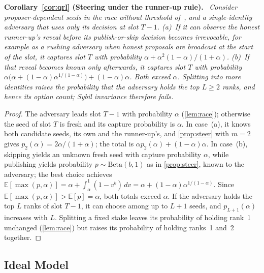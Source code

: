 \documentclass[10pt,journal,compsoc]{IEEEtran}
\theoremstyle{tplain}
\theoremstyle{tdef}
\theoremstyle{remark}
\newenvironment{restate}[1]{\par\smallskip\noindent\textbf{#1.}\ \itshape\ignorespaces}{\par\smallskip}
\begin{document}
\begin{restate}{Corollary~\ref{cor:qrl} (Steering under the runner-up rule)}
Consider proposer-dependent seeds in the race without threshold of~\cite{QRL}, and a single-identity adversary that uses only its decision at slot $T-1$. (a)~If it can observe the honest runner-up's reveal before its publish-or-skip decision becomes irrevocable, for example as a rushing adversary when honest proposals are broadcast at the start of the slot, it captures slot $T$ with probability $\alpha+\alpha^2(1-\alpha)/(1+\alpha)$. (b)~If that reveal becomes known only afterwards, it captures slot $T$ with probability $\alpha\big(\alpha+(1-\alpha)\alpha^{1/(1-\alpha)}\big)+(1-\alpha)\alpha$. Both exceed $\alpha$. Splitting into more identities raises the probability that the adversary holds the top $L\ge 2$ ranks, and hence its option count; Sybil invariance therefore fails.
\end{restate}
\begin{proof}
The adversary leads slot $T-1$ with probability $\alpha$ (\cref{lem:race}); otherwise the seed of slot $T$ is fresh and its capture probability is $\alpha$. In case~(a), it knows both candidate seeds, its own and the runner-up's, and \cref{prop:steer} with $m=2$ gives $p_2(\alpha)=2\alpha/(1+\alpha)$; the total is $\alpha p_2(\alpha)+(1-\alpha)\alpha$. In case~(b), skipping yields an unknown fresh seed with capture probability $\alpha$, while publishing yields probability $p\sim\mathrm{Beta}(b,1)$ as in \cref{prop:steer}, known to the adversary; the best choice achieves $\mathbb E[\max(p,\alpha)]=\alpha+\int_\alpha^1(1-v^b)\,dv=\alpha+(1-\alpha)\alpha^{1/(1-\alpha)}$. Since $\mathbb E[\max(p,\alpha)]>\mathbb E[p]=\alpha$, both totals exceed $\alpha$. If the adversary holds the top $L$ ranks of slot $T-1$, it can choose among up to $L+1$ seeds, and $p_{L+1}(\alpha)$ increases with $L$. Splitting a fixed stake leaves its probability of holding rank~1 unchanged (\cref{lem:race}) but raises its probability of holding ranks~1 and~2 together.
\end{proof}

\subsection{Ideal Model}\label{S-cons-ideal}
\end{document}
